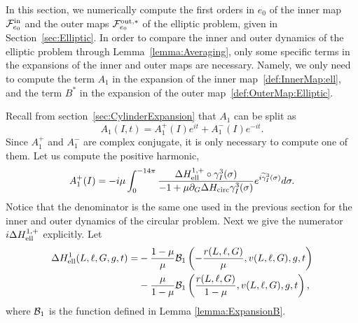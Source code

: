 In this section, we numerically compute the first orders in $e_0$ of
the inner map $\mathcal{F}_{e_0}^{\mathrm{in}}$ and the outer maps
$\mathcal{F}_{e_0}^{\mathrm{out},\ast}$ of the elliptic problem, given in
Section~\ref{sec:Elliptic}. 
In order to compare the inner and outer dynamics of the elliptic
problem through Lemma~\ref{lemma:Averaging}, only some specific terms
in the expansions of the inner and outer maps are necessary. 
Namely, we only need to compute the term $A_1$ in the expansion of the
inner map~\eqref{def:InnerMap:ell}, and the term $B^*$ in the
expansion of the outer map~\eqref{def:OuterMap:Elliptic}.

Recall from section~\ref{sec:CylinderExpansion} that $A_1$ can be
split as 
  \[
  A_1(I,t)=A_1^+(I)e^{it}+A_1^-(I)e^{-it}.
  \]
Since $A_1^+$ and $A_1^-$ are complex conjugate, it is only necessary
to compute one of them. Let us compute the positive harmonic,
  \begin{equation}\label{def:A:plus:Numerics}
    A_1^+(I)=-i\mu\int_0^{-14\pi}\frac{\Delta H_{\mathrm{ell}}^{1,+}\circ
\gamma_I^3(\sigma)}{-1+\mu\partial_G\Delta
H_{\mathrm{circ}}\gamma_I^3(\sigma)}e^{i\widetilde\gamma_I^3(\sigma)}d\sigma.
  \end{equation}
Notice that the denominator is the same one used in the previous
section for the inner and outer dynamics of the circular problem. 
Next we give the numerator $i\Delta H_{\mathrm{ell}}^{1,+}$ explicitly.
Let 
  \begin{equation}\label{def:Ham:Elliptic:order1}
    \begin{split}
      \Delta H^1_{\mathrm{ell}}(L,\ell,G,g,t) =&
-\frac{1-\mu}{\mu}\mathcal{B}_1\left(-\frac{r(L,\ell,G)}{\mu},v(L,\ell,G),g,t\right)\\
      &-\frac{\mu}{1-\mu}\mathcal{B}_1\left(\frac{r(L,\ell,G)}{1-\mu},v(L,\ell,G),g,t\right),
    \end{split}
  \end{equation}
  where $\mathcal{B}_1$ is the function defined in Lemma
\ref{lemma:ExpansionB}.

